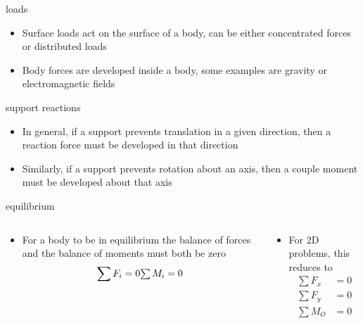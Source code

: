 \documentclass[12pt,handout]{beamer}
\providecommand{\tightlist}{%
  \setlength{\itemsep}{0pt}\setlength{\parskip}{0pt}}
\providecommand{\tightlist}{%
\setlength{\itemsep}{0pt}\setlength{\parskip}{0pt}}
\begin{document}
\begin{frame}{loads}
\protect\hypertarget{loads}{}
\begin{itemize}
\tightlist
\item
  Surface loads act on the surface of a body, can be either concentrated
  forces or distributed loads
\item
  Body forces are developed inside a body, some examples are gravity or
  electromagnetic fields
\end{itemize}
\end{frame}

\begin{frame}{support reactions}
\protect\hypertarget{support-reactions}{}
\begin{itemize}
\tightlist
\item
  In general, if a support prevents translation in a given direction,
  then a reaction force must be developed in that direction
\item
  Similarly, if a support prevents rotation about an axis, then a couple
  moment must be developed about that axis
\end{itemize}
\end{frame}

\begin{frame}{equilibrium}
\protect\hypertarget{equilibrium}{}
\begin{columns}[T]
\begin{column}{0.5\textwidth}
\begin{itemize}
\tightlist
\item
  For a body to be in equilibrium the balance of forces and the balance
  of moments must both be zero \[\sum F_i =0$$ $$\sum M_i =0\]
\end{itemize}
\end{column}

\begin{column}{0.5\textwidth}
\begin{itemize}
\tightlist
\item
  For 2D problems, this reduces to \[\begin{aligned}
    \sum F_x &= 0\\
    \sum F_y &= 0\\
    \sum M_O &= 0
  \end{aligned}\]
\end{itemize}
\end{column}
\end{columns}
\end{frame}
\end{document}
